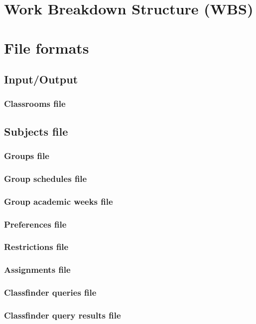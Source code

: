 \section{Work Breakdown Structure (WBS)}



\section{File formats}


\subsection{Input/Output}

\subsubsection{Classrooms file}
\subsection{Subjects file}
\subsubsection{Groups file}
\subsubsection{Group schedules file}
\subsubsection{Group academic weeks file}
\subsubsection{Preferences file}
\subsubsection{Restrictions file}
\subsubsection{Assignments file}
\subsubsection{Classfinder queries file}
\subsubsection{Classfinder query results file}
